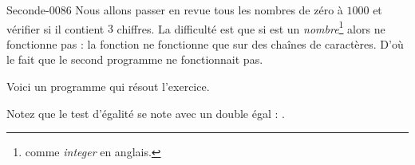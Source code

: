 
\begin{corrige}{Seconde-0086}
    Nous allons passer en revue tous les nombres de zéro à \( 1000\) et vérifier si il contient \( 3\) chiffres. La difficulté est que si  est un \emph{nombre}\footnote{ comme \emph{integer} en anglais.} alors  ne fonctionne pas : la fonction  ne fonctionne que sur des chaînes de caractères. D'où le fait que le second programme ne fonctionnait pas.

    Voici un programme qui résout l'exercice.

    

    Notez que le test d'égalité se note avec un double égal : \info{==}.

\end{corrige}
